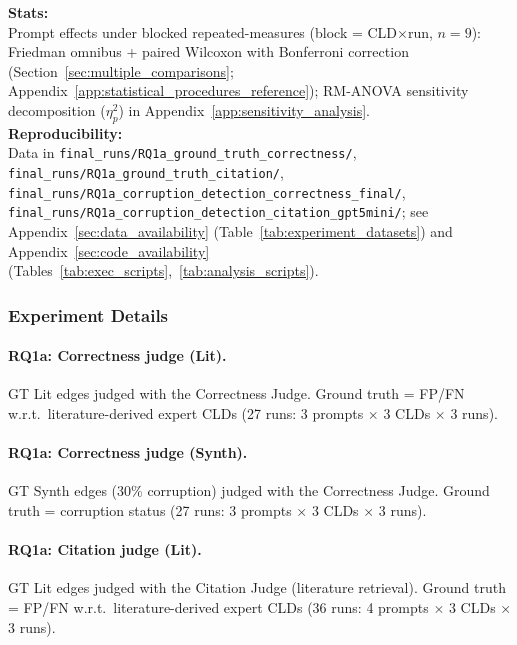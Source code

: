 \textbf{Stats:}\\
Prompt effects under blocked repeated-measures (block = CLD$\times$run, $n{=}9$): Friedman omnibus + paired Wilcoxon with Bonferroni correction (Section~\ref{sec:multiple_comparisons}; Appendix~\ref{app:statistical_procedures_reference}); RM-ANOVA sensitivity decomposition ($\eta^2_p$) in Appendix~\ref{app:sensitivity_analysis}.\\
\textbf{Reproducibility:}\\
Data in \texttt{final\_runs/RQ1a\_ground\_truth\_correctness/}, \texttt{final\_runs/RQ1a\_ground\_truth\_citation/}, \texttt{final\_runs/RQ1a\_corruption\_detection\_correctness\_final/}, \texttt{final\_runs/RQ1a\_corruption\_detection\_citation\_gpt5mini/}; see Appendix~\ref{sec:data_availability} (Table~\ref{tab:experiment_datasets}) and Appendix~\ref{sec:code_availability} (Tables~\ref{tab:exec_scripts},~\ref{tab:analysis_scripts}).

\subsubsection{Experiment Details}

\paragraph{RQ1a: Correctness judge (Lit).}\label{sec:rq1a_correctness_lit}
GT Lit edges judged with the Correctness Judge. Ground truth = FP/FN w.r.t.\ literature-derived expert CLDs (27 runs: 3 prompts $\times$ 3 CLDs $\times$ 3 runs).

\paragraph{RQ1a: Correctness judge (Synth).}\label{sec:rq1a_correctness_synth}
GT Synth edges (30\% corruption) judged with the Correctness Judge. Ground truth = corruption status (27 runs: 3 prompts $\times$ 3 CLDs $\times$ 3 runs).

\paragraph{RQ1a: Citation judge (Lit).}\label{sec:rq1a_citation_lit}
GT Lit edges judged with the Citation Judge (literature retrieval). Ground truth = FP/FN w.r.t.\ literature-derived expert CLDs (36 runs: 4 prompts $\times$ 3 CLDs $\times$ 3 runs).

